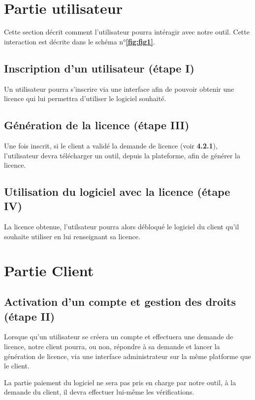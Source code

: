 \section{Partie utilisateur}

Cette section décrit comment l'utilisateur pourra intéragir avec notre outil. Cette interaction est décrite dans le schéma n°\textbf{\ref{fig:fig1}}.

\subsection{Inscription d'un utilisateur (étape I)}

Un utilisateur pourra s'inscrire via une interface afin de pouvoir obtenir une licence qui lui permettra d'utiliser le logiciel souhaité. 

\subsection{Génération de la licence (étape III)}

Une fois inscrit, si le client a validé la demande de licence (voir \textbf{4.2.1}), l'utilisateur devra télécharger un outil, depuis la
plateforme, afin de générer la licence.

\subsection{Utilisation du logiciel avec la licence (étape IV)}

La licence obtenue, l'utilsateur pourra alors débloqué le logiciel du client qu'il souhaite utiliser en lui renseignant
sa licence.

\section{Partie Client}

\subsection{Activation d'un compte et gestion des droits (étape II)}

Lorsque qu'un utilisateur se créera un compte et effectuera une demande de licence, notre client pourra, ou non, répondre
à sa demande et lancer la génération de licence, via une interface administrateur sur la même platforme que le client.

La partie paiement du logiciel ne sera pas pris en charge par notre outil, à la demande du client,
il devra effectuer lui-même les vérifications.
\newpage

